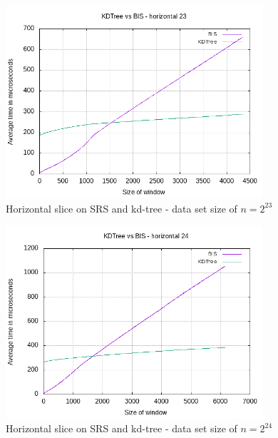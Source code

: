 \begin{figure}[h]
    \centering
    \includegraphics[width = 0.85\textwidth]{pictures/analysis/hori_23.png}
    \caption{Horizontal slice on SRS and kd-tree - data set size of $n=2^{23}$}\label{fig:hori_23}
\end{figure}

\begin{figure}[h]
    \centering
    \includegraphics[width = 0.85\textwidth]{pictures/analysis/hori_24.png}
    \caption{Horizontal slice on SRS and kd-tree - data set size of $n=2^{24}$}\label{fig:hori_24}
\end{figure}

